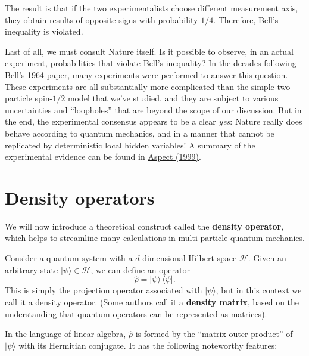 \documentclass[pra,12pt]{revtex4}
\begin{document}
The result is that if the two experimentalists choose different
measurement axis, they obtain results of opposite signs with
probability $1/4$.  Therefore, Bell's inequality is violated.

Last of all, we must consult Nature itself.  Is it possible to
observe, in an actual experiment, probabilities that violate Bell's
inequality?  In the decades following Bell's 1964 paper, many
experiments were performed to answer this question.  These experiments
are all substantially more complicated than the simple two-particle
spin-$1/2$ model that we've studied, and they are subject to various
uncertainties and ``loopholes'' that are beyond the scope of our
discussion.  But in the end, the experimental consensus appears to be
a clear \textit{yes}: Nature really does behave according to quantum
mechanics, and in a manner that cannot be replicated by deterministic
local hidden variables!  A summary of the experimental evidence can be
found in \hyperref[cite:aspect]{Aspect (1999)}.

\section{Density operators}

We will now introduce a theoretical construct called the
\textbf{density operator}, which helps to streamline many calculations
in multi-particle quantum mechanics.

Consider a quantum system with a $d$-dimensional Hilbert space
$\mathscr{H}$.  Given an arbitrary state $|\psi\rangle \in
\mathscr{H}$, we can define an operator
\begin{equation}
  \hat{\rho} = |\psi\rangle\, \langle\psi|.
\end{equation}
This is simply the projection operator associated with $|\psi\rangle$,
but in this context we call it a density operator.  (Some authors call
it a \textbf{density matrix}, based on the understanding that
quantum operators can be represented as matrices).

In the language of linear algebra, $\hat{\rho}$ is formed by the
``matrix outer product'' of $|\psi\rangle$ with its Hermitian
conjugate.  It has the following noteworthy features:
\end{document}
